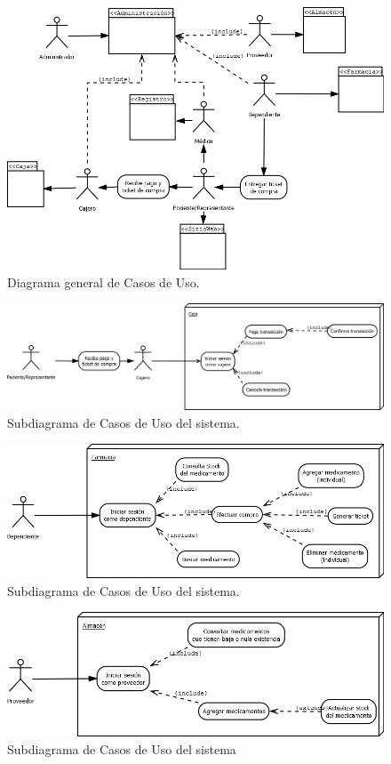 \documentclass[oneside,10pt]{book}
\begin{document}
	
	\begin{figure}[htbp!]
	\centering
		\includegraphics[width=1\textwidth]{images/cu/diagramaGral2}
		\caption{Diagrama general de Casos de Uso.}
	\end{figure}
	\begin{figure}[htbp!]
		\centering
			\includegraphics[width=1\textwidth]{images/cu/caja}
		\caption{Subdiagrama de Casos de Uso del sistema.}
	\end{figure}
	\begin{figure}[htbp!]
		\centering
			\includegraphics[width=1\textwidth]{images/cu/farmacia}
		\caption{Subdiagrama de Casos de Uso del sistema.}
	\end{figure}
	\begin{figure}[htbp!]
		\centering
			\includegraphics[width=1\textwidth]{images/cu/almacen}
		\caption{Subdiagrama de Casos de Uso del sistema}
	\end{figure}
\end{document}
